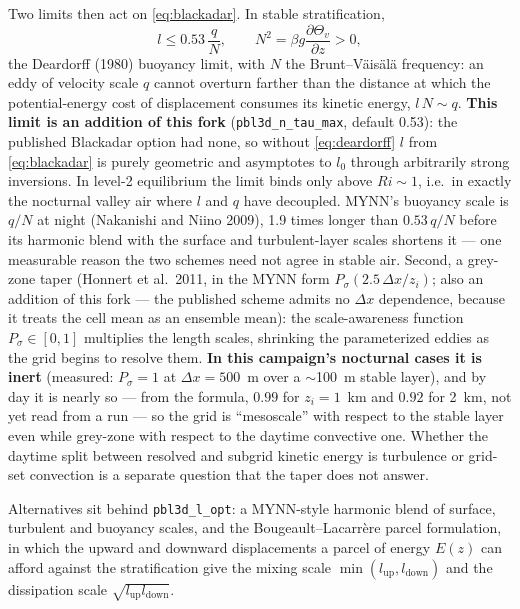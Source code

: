 \documentclass[10pt,a4paper]{article}
\newcommand{\keytag}[1]{\colorbox{keyc}{\textcolor{white}{\sffamily\bfseries\scriptsize K#1}}}
\newcommand{\key}[1]{\marginpar[\raggedleft\keytag{#1}]{\raggedright\keytag{#1}}\ignorespaces}
\newcommand{\kh}[1]{{\color{keyc!80!black}\bfseries #1}}
\newcommand{\pd}[2]{\frac{\partial #1}{\partial #2}}
\begin{document}
Two limits then act on \eqref{eq:blackadar}. In stable stratification,
\begin{equation}
l \le 0.53\,\frac{q}{N},
\qquad N^2 = \beta g \pd{\Theta_v}{z} > 0,
\label{eq:deardorff}
\end{equation}
the Deardorff (1980) buoyancy limit, with $N$ the Brunt--Väisälä frequency: an eddy of velocity scale $q$ cannot overturn farther than the distance at which the potential-energy cost of displacement consumes its kinetic energy, $l\,N \sim q$. \kh{This limit is an addition of this fork} (\texttt{pbl3d\_n\_tau\_max}, default 0.53): the published Blackadar option had none, so without \eqref{eq:deardorff} $l$ from \eqref{eq:blackadar} is purely geometric and asymptotes to $l_0$ through arbitrarily strong inversions. In level-2 equilibrium the limit binds only above $Ri \sim 1$, i.e.\ in exactly the nocturnal valley air where $l$ and $q$ have decoupled. MYNN's buoyancy scale is $q/N$ at night (Nakanishi and Niino 2009), 1.9 times longer than $0.53\,q/N$ before its harmonic blend with the surface and turbulent-layer scales shortens it — one measurable reason the two schemes need not agree in stable air. \key{9}Second, a grey-zone taper (Honnert et al.\ 2011, in the MYNN form $P_{\sigma}(2.5\,\Delta x / z_i)$; also an addition of this fork — the published scheme admits no $\Delta x$ dependence, because it treats the cell mean as an ensemble mean): the scale-awareness function $P_{\sigma} \in [0,1]$ multiplies the length scales, shrinking the parameterized eddies as the grid begins to resolve them. \kh{In this campaign's nocturnal cases it is inert} (measured: $P_\sigma = 1$ at $\Delta x = 500$~m over a $\sim$100~m stable layer), and by day it is nearly so — from the formula, $0.99$ for $z_i = 1$~km and $0.92$ for 2~km, not yet read from a run — so the grid is ``mesoscale'' with respect to the stable layer even while grey-zone with respect to the daytime convective one. Whether the daytime split between resolved and subgrid kinetic energy is turbulence or grid-set convection is a separate question that the taper does not answer.

Alternatives sit behind \texttt{pbl3d\_l\_opt}: a MYNN-style harmonic blend of surface, turbulent and buoyancy scales, and the Bougeault--Lacarrère parcel formulation, in which the upward and downward displacements a parcel of energy $E(z)$ can afford against the stratification give the mixing scale $\min(l_\mathrm{up}, l_\mathrm{down})$ and the dissipation scale $\sqrt{l_\mathrm{up} l_\mathrm{down}}$.
\end{document}
